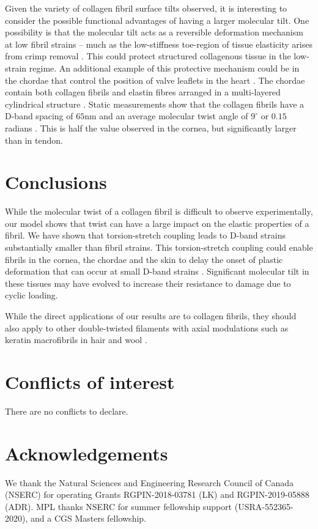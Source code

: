 \documentclass[preprint,12pt]{elsarticle}
\begin{document}
Given the variety of collagen fibril surface tilts observed, it is interesting to consider the possible functional advantages of having a larger molecular tilt. One possibility is that the molecular tilt acts as a reversible deformation mechanism at low fibril strains -- much as the low-stiffness toe-region of tissue elasticity arises from crimp removal \cite{Fratzl:1998}. This could protect structured collagenous tissue in the low-strain regime. An additional example of this protective mechanism could be in the chordae that control the position of valve leaflets in the heart \cite{Ross:2020}. The chordae contain both collagen fibrils and elastin fibres arranged in a multi-layered cylindrical structure \cite{Millington:1998}. Static measurements show that the collagen fibrils have a D-band spacing of $65\mathrm{nm}$ and an average molecular twist angle of $9^\circ$ or $0.15$ radians \cite{Folkhard:1987}. This is half the value observed in the cornea, but significantly larger than in tendon.

\section{Conclusions}
\label{sec:conclusion}
While the molecular twist of a collagen fibril is difficult to observe experimentally, our model shows that twist can have a large impact on the elastic properties of a fibril. We have shown that torsion-stretch coupling leads to D-band strains substantially smaller than fibril strains. This torsion-stretch coupling could enable fibrils in the cornea, the chordae and the skin to delay the onset of plastic deformation that can occur at small D-band strains \cite{Gautieri:2017}. Significant molecular tilt in these tissues may have evolved to increase their resistance to damage due to cyclic loading.

While the direct applications of our results are to collagen fibrils, they should also apply to other double-twisted filaments with axial modulations such as keratin macrofibrils in hair and wool \cite{Kreplak:2002, Harland:2014}. 

\section*{Conflicts of interest}
There are no conflicts to declare.
\section*{Acknowledgements}
We thank the Natural Sciences and Engineering Research Council of Canada (NSERC) for operating Grants RGPIN-2018-03781 (LK) and RGPIN-2019-05888 (ADR). MPL thanks NSERC for summer fellowship support (USRA-552365-2020), and a CGS Masters fellowship.

 

\end{document}
